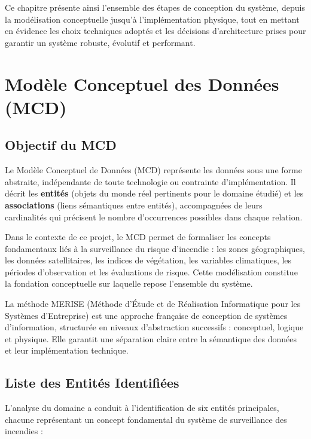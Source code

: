\documentclass[12pt,a4paper]{report}
\begin{document}
Ce chapitre présente ainsi l'ensemble des étapes de conception du système, depuis la modélisation conceptuelle jusqu'à l'implémentation physique, tout en mettant en évidence les choix techniques adoptés et les décisions d'architecture prises pour garantir un système robuste, évolutif et performant.

\section{Modèle Conceptuel des Données (MCD)}

\subsection{Objectif du MCD}

Le Modèle Conceptuel de Données (MCD) représente les données sous une forme abstraite, indépendante de toute technologie ou contrainte d'implémentation. Il décrit les \textbf{entités} (objets du monde réel pertinents pour le domaine étudié) et les \textbf{associations} (liens sémantiques entre entités), accompagnées de leurs cardinalités qui précisent le nombre d'occurrences possibles dans chaque relation.

Dans le contexte de ce projet, le MCD permet de formaliser les concepts fondamentaux liés à la surveillance du risque d'incendie : les zones géographiques, les données satellitaires, les indices de végétation, les variables climatiques, les périodes d'observation et les évaluations de risque. Cette modélisation constitue la fondation conceptuelle sur laquelle repose l'ensemble du système.

\begin{infobox}
La méthode MERISE (Méthode d'Étude et de Réalisation Informatique pour les Systèmes d'Entreprise) est une approche française de conception de systèmes d'information, structurée en niveaux d'abstraction successifs : conceptuel, logique et physique. Elle garantit une séparation claire entre la sémantique des données et leur implémentation technique.
\end{infobox}

\subsection{Liste des Entités Identifiées}

L'analyse du domaine a conduit à l'identification de six entités principales, chacune représentant un concept fondamental du système de surveillance des incendies :
\end{document}
